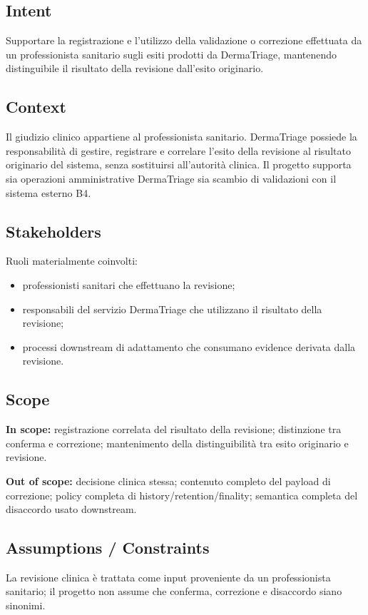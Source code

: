 \documentclass[11pt,a4paper]{article}
\begin{document}
\subsection{Intent}
Supportare la registrazione e l'utilizzo della validazione o correzione effettuata da un professionista sanitario sugli esiti prodotti da DermaTriage, mantenendo distinguibile il risultato della revisione dall'esito originario.

\subsection{Context}
Il giudizio clinico appartiene al professionista sanitario. DermaTriage possiede la responsabilità di gestire, registrare e correlare l'esito della revisione al risultato originario del sistema, senza sostituirsi all'autorità clinica. Il progetto supporta sia operazioni amministrative DermaTriage sia scambio di validazioni con il sistema esterno B4.

\subsection{Stakeholders}
Ruoli materialmente coinvolti:
\begin{itemize}
\item professionisti sanitari che effettuano la revisione;
\item responsabili del servizio DermaTriage che utilizzano il risultato della revisione;
\item processi downstream di adattamento che consumano evidence derivata dalla revisione.
\end{itemize}

\subsection{Scope}
\textbf{In scope:} registrazione correlata del risultato della revisione; distinzione tra conferma e correzione; mantenimento della distinguibilità tra esito originario e revisione.

\textbf{Out of scope:} decisione clinica stessa; contenuto completo del payload di correzione; policy completa di history/retention/finality; semantica completa del disaccordo usato downstream.

\subsection{Assumptions / Constraints}
La revisione clinica è trattata come input proveniente da un professionista sanitario; il progetto non assume che conferma, correzione e disaccordo siano sinonimi.
\end{document}
